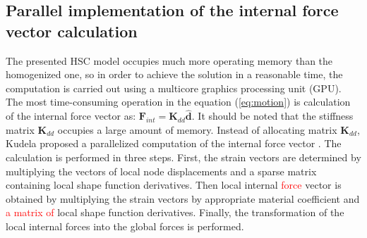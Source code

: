 \documentclass[sensors,article,submit,moreauthors,pdftex]{Definitions/mdpi}
\begin{document}
\subsection{Parallel implementation of the internal force vector calculation}
\label{sec:f_internal}
The presented HSC model occupies much more operating memory than the homogenized one, so in order to achieve the solution in a reasonable time, the computation is carried out using a multicore graphics processing unit (GPU).  
The most time-consuming operation in the equation (\ref{eq:motion}) is calculation of the internal force vector as: \(\textbf{F}_{int}=\textbf{K}_{dd} \widehat{\textbf{d}}\).
It should be noted that the stiffness matrix \(\textbf{K}_{dd}\) occupies a large amount of memory.
Instead of allocating matrix \(\textbf{K}_{dd}\), Kudela proposed a parallelized computation of the internal force vector \cite{kudela2016parallel}.
The calculation is performed in three steps.
First, the strain vectors are determined by multiplying the vectors of local node displacements and a sparse matrix containing local shape function derivatives.
Then local internal \textcolor{red}{force} vector is obtained by multiplying the strain vectors by appropriate material coefficient and \textcolor{red}{a matrix of} local shape function derivatives.
Finally, the transformation of the local internal forces into the global forces is performed.
\end{document}
